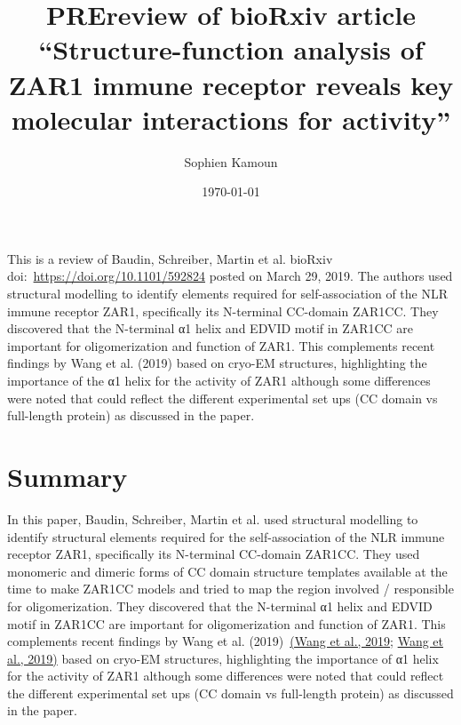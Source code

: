 \documentclass[10pt]{article}
\renewenvironment{abstract}
  {{\bfseries\noindent{\abstractname}\par\nobreak}\footnotesize}
  {\bigskip}
\begin{document}
\title{PREreview of bioRxiv article ``Structure-function analysis of ZAR1
immune receptor reveals key molecular interactions for activity''}



\author[1]{Sophien Kamoun}%
%


\vspace{-1em}



  \date{\today}


\begingroup
\let\center\flushleft
\let\endcenter\endflushleft
\maketitle
\endgroup





\begin{abstract}
This is a review of Baudin, Schreiber, Martin et al. bioRxiv
doi:~\url{https://doi.org/10.1101/592824} posted on March 29, 2019. The
authors used structural modelling to identify elements required for
self-association of the NLR immune receptor ZAR1, specifically its
N-terminal CC-domain ZAR1CC. They discovered that the N-terminal α1
helix and EDVID motif in ZAR1CC are important for oligomerization and
function of ZAR1. This complements recent findings by Wang et al. (2019)
based on cryo-EM structures, highlighting the importance of the α1 helix
for the activity of ZAR1 although some differences were noted that could
reflect the different experimental set ups (CC domain vs full-length
protein) as discussed in the paper.%
\end{abstract}%




\section*{Summary}

{\label{631475}}

In this paper, Baudin, Schreiber, Martin et al. used structural
modelling to identify structural elements required for the
self-association of the NLR immune receptor ZAR1, specifically its
N-terminal CC-domain ZAR1CC. They used monomeric and dimeric forms of CC
domain structure templates available at the time to make ZAR1CC models
and tried to map the region involved / responsible for oligomerization.
They discovered that the N-terminal α1 helix and EDVID motif in ZAR1CC
are important for oligomerization and function of ZAR1. This complements
recent findings by Wang et al. (2019)~\hyperref[csl:1]{(Wang et al., 2019}; \hyperref[csl:2]{Wang et al., 2019)} based on
cryo-EM structures, highlighting the importance of α1 helix for the
activity of ZAR1 although some differences were noted that could reflect
the different experimental set ups (CC domain vs full-length protein) as
discussed in the paper.~
\end{document}
